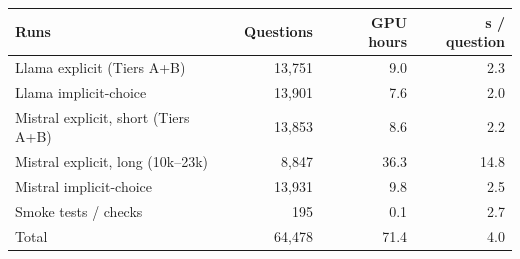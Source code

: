 \begin{tabular}{lrrr}
\toprule
Runs & Questions & GPU hours & s / question \\
\midrule
Llama explicit (Tiers A+B) & 13,751 & 9.0 & 2.3 \\
Llama implicit-choice & 13,901 & 7.6 & 2.0 \\
Mistral explicit, short (Tiers A+B) & 13,853 & 8.6 & 2.2 \\
Mistral explicit, long (10k--23k) & 8,847 & 36.3 & 14.8 \\
Mistral implicit-choice & 13,931 & 9.8 & 2.5 \\
Smoke tests / checks & 195 & 0.1 & 2.7 \\
\midrule
Total & 64,478 & 71.4 & 4.0 \\
\bottomrule
\end{tabular}
